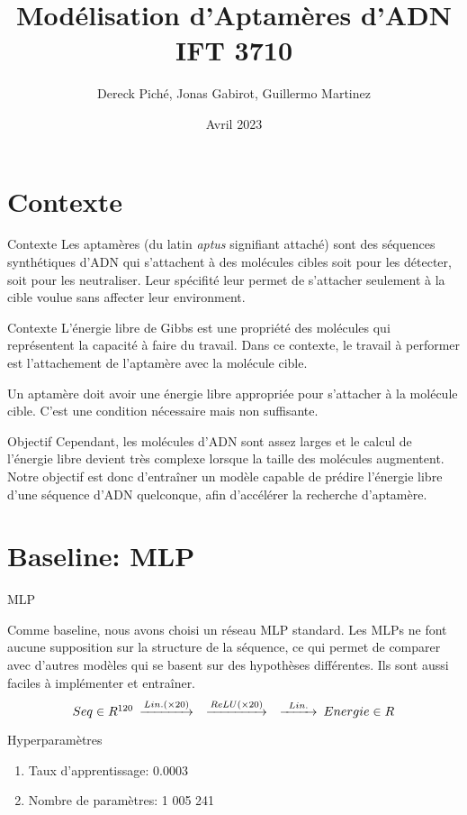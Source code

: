 \documentclass{beamer}
\title{Modélisation d'Aptamères d'ADN IFT 3710}
\author{Dereck Piché, Jonas Gabirot, Guillermo Martinez}
\institute{Université de Montréal}
\date{Avril 2023}
\begin{document}
\frame{\titlepage}

\section{Contexte}

\begin{frame}{Contexte}
Les aptamères (du latin \emph{aptus} signifiant attaché) sont des séquences synthétiques d'ADN qui s'attachent à des molécules cibles soit pour les détecter, soit pour les neutraliser. Leur spécifité leur permet de s'attacher seulement à la cible voulue sans affecter leur environment.
\end{frame}


\begin{frame}{Contexte}
L'énergie libre de Gibbs est une propriété des molécules qui représentent la capacité à faire du travail. Dans ce contexte, le travail à performer est l'attachement de l'aptamère avec la molécule cible. 

Un aptamère doit avoir une énergie libre appropriée pour s'attacher à la molécule cible. C'est une condition nécessaire mais non suffisante.
\end{frame}


\begin{frame}{Objectif}
Cependant, les molécules d'ADN sont assez larges et le calcul de l'énergie libre devient très complexe lorsque la taille des molécules augmentent. Notre objectif est donc d'entraîner un modèle capable de prédire l'énergie libre d'une séquence d'ADN quelconque, afin d'accélérer la recherche d'aptamère.
\end{frame}


\section{Baseline: MLP}
\begin{frame}{MLP}

Comme baseline, nous avons choisi un réseau MLP standard. Les MLPs ne font aucune supposition sur la structure de la séquence, ce qui permet de comparer avec d'autres modèles qui se basent sur des hypothèses différentes. Ils sont aussi faciles à implémenter et entraîner. 
\begin{equation*}
    \begin{CD}
        @. Seq \in R^{120}
        @>Lin. (\times 20)>> 
        @>ReLU (\times 20)>> 
        @>Lin.>> 
        Energie \in R
    \end{CD}
\end{equation*}

\begin{block}{Hyperparamètres}
\begin{enumerate}
    \item Taux d'apprentissage: 0.0003
    \item Nombre de paramètres: 1 005 241
\end{enumerate}
\end{block}

\end{frame}
\end{document}
